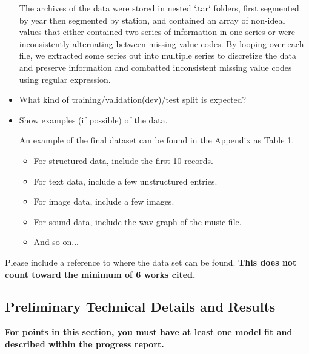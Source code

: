 \documentclass[conference]{IEEEtran}
\begin{document}
\begin{itemize}
    The archives of the data were stored in nested `.tar` folders, first segmented by year then segmented by station, and contained an array of non-ideal values that either contained two series of information in one series or were inconsistently alternating between missing value codes. By looping over each file, we extracted some series out into multiple series to discretize the data and preserve information and combatted inconsistent missing value codes using regular expression.
  
  \item What kind of training/validation(dev)/test split is expected?
  
  \item Show examples (if possible) of the data.
  
  An example of the final dataset can be found in the Appendix as Table 1.
  
  \begin{itemize}
    \item For structured data, include the first 10 records.
    \item For text data, include a few unstructured entries.
    \item For image data, include a few images.
    \item For sound data, include the wav graph of the music file.
    \item And so on...
  \end{itemize}
\end{itemize}

Please include a reference to where the data set can be found. \textbf{This does not count toward the minimum of 6 works cited.}

\subsection{Preliminary Technical Details and Results}

\textbf{For points in this section, you must have \underline{at least one model fit} and described within the progress report.}
\end{document}
